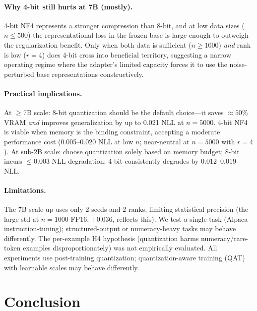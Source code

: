 \documentclass{article}
\begin{document}
\paragraph{Why 4-bit still hurts at 7B (mostly).}
4-bit NF4 represents a stronger compression than 8-bit, and at low data sizes
($n \leq 500$) the representational loss in the frozen base is large enough to
outweigh the regularization benefit. Only when both data is sufficient ($n \geq 1000$)
\emph{and} rank is low ($r=4$) does 4-bit cross into beneficial territory, suggesting
a narrow operating regime where the adapter's limited capacity forces it to use the
noise-perturbed base representations constructively.

\paragraph{Practical implications.}
At $\geq\!7$B scale: 8-bit quantization should be the default choice---it saves
${\approx}50\%$ VRAM \emph{and} improves generalization by up to 0.021 NLL at
$n=5000$. 4-bit NF4 is viable when memory is the binding constraint, accepting a
moderate performance cost (0.005--0.020 NLL at low $n$; near-neutral at $n=5000$
with $r=4$). At sub-2B scale: choose quantization solely based on memory budget;
8-bit incurs $\leq 0.003$ NLL degradation; 4-bit consistently degrades by 0.012--0.019 NLL.

\paragraph{Limitations.}
The 7B scale-up uses only 2 seeds and 2 ranks, limiting statistical precision
(the large std at $n=1000$ FP16, $\pm0.036$, reflects this). We test a single
task (Alpaca instruction-tuning); structured-output or numeracy-heavy tasks may
behave differently. The per-example H4 hypothesis (quantization harms
numeracy/rare-token examples disproportionately) was not empirically evaluated.
All experiments use post-training quantization; quantization-aware training (QAT)
with learnable scales may behave differently.

\section{Conclusion}
\end{document}

